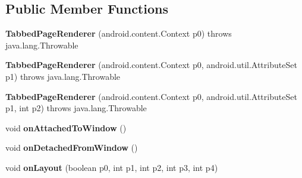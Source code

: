 \subsection*{Public Member Functions}
\begin{DoxyCompactItemize}
\item 
\hypertarget{classmd5eb25e0c6f853c9e5104b7654c9dc6cdf_1_1TabbedPageRenderer_ad90de2fe0731bb18fcbb54040fd2d5d5}{}{\bfseries Tabbed\+Page\+Renderer} (android.\+content.\+Context p0)  throws java.\+lang.\+Throwable 	\label{classmd5eb25e0c6f853c9e5104b7654c9dc6cdf_1_1TabbedPageRenderer_ad90de2fe0731bb18fcbb54040fd2d5d5}

\item 
\hypertarget{classmd5eb25e0c6f853c9e5104b7654c9dc6cdf_1_1TabbedPageRenderer_a909b579d0b06ec0e3749f6bf8c198f96}{}{\bfseries Tabbed\+Page\+Renderer} (android.\+content.\+Context p0, android.\+util.\+Attribute\+Set p1)  throws java.\+lang.\+Throwable 	\label{classmd5eb25e0c6f853c9e5104b7654c9dc6cdf_1_1TabbedPageRenderer_a909b579d0b06ec0e3749f6bf8c198f96}

\item 
\hypertarget{classmd5eb25e0c6f853c9e5104b7654c9dc6cdf_1_1TabbedPageRenderer_a4df3800ca5916f84a2a9bdd3c1cdccf2}{}{\bfseries Tabbed\+Page\+Renderer} (android.\+content.\+Context p0, android.\+util.\+Attribute\+Set p1, int p2)  throws java.\+lang.\+Throwable 	\label{classmd5eb25e0c6f853c9e5104b7654c9dc6cdf_1_1TabbedPageRenderer_a4df3800ca5916f84a2a9bdd3c1cdccf2}

\item 
\hypertarget{classmd5eb25e0c6f853c9e5104b7654c9dc6cdf_1_1TabbedPageRenderer_aa9435825987cf160cc8d18c240a689cf}{}void {\bfseries on\+Attached\+To\+Window} ()\label{classmd5eb25e0c6f853c9e5104b7654c9dc6cdf_1_1TabbedPageRenderer_aa9435825987cf160cc8d18c240a689cf}

\item 
\hypertarget{classmd5eb25e0c6f853c9e5104b7654c9dc6cdf_1_1TabbedPageRenderer_a09173676d815e0950e035ebedb1c6bc2}{}void {\bfseries on\+Detached\+From\+Window} ()\label{classmd5eb25e0c6f853c9e5104b7654c9dc6cdf_1_1TabbedPageRenderer_a09173676d815e0950e035ebedb1c6bc2}

\item 
\hypertarget{classmd5eb25e0c6f853c9e5104b7654c9dc6cdf_1_1TabbedPageRenderer_ae63e5700bde06c550160d379b5f49ef7}{}void {\bfseries on\+Layout} (boolean p0, int p1, int p2, int p3, int p4)\label{classmd5eb25e0c6f853c9e5104b7654c9dc6cdf_1_1TabbedPageRenderer_ae63e5700bde06c550160d379b5f49ef7}


\end{DoxyCompactItemize}
